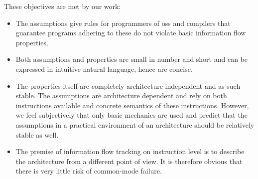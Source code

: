 These objectives are met by our work:
\begin{itemize}
    \item The assumptions give rules for programmers of \glspl{os} and compilers that guarantee programs adhering to these do not violate basic information flow properties.
    \item Both assumptions and properties are small in number and short and can be expressed in intuitive natural language, hence are concise.
    \item The properties itself are completely architecture independent and as such stable.
    The assumptions are architecture dependent and rely on both instructions available and concrete semantics of these instructions.
    However, we feel subjectively that only basic mechanics are used and predict that the assumptions in a practical environment of an architecture should be relatively stable as well.
    \item The premise of information flow tracking on instruction level is to describe the architecture from a different point of view.
    It is therefore obvious that there is very little risk of common-mode failure.
\end{itemize}

